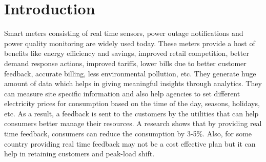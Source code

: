 \documentclass{sig-alternate}
\begin{document}
\begin{abstract}
%
%
\end{abstract}

%


\section{Introduction}
Smart meters consisting of real time sensors, power outage notifications and power quality monitoring are widely used today. These meters provide a host of benefits like energy efficiency and savings, improved retail competition, better demand response actions, improved tariffs, lower bills due to better customer feedback, accurate billing, less environmental pollution, etc. %
They generate huge amount of data which helps in giving meaningful insights through analytics.
They can measure site specific information and also help agencies to set different electricity prices for consumption based on the time of the day, seasons, holidays, etc. As a result, a feedback is sent to the customers by the utilities that can help consumers better manage their resources. A research \cite{mckerracher} shows that by providing real time feedback, consumers can reduce the consumption by 3-5\%. Also, for some country providing real time feedback may not be a cost effective plan but it can help in retaining customers and peak-load shift.
\end{document}

